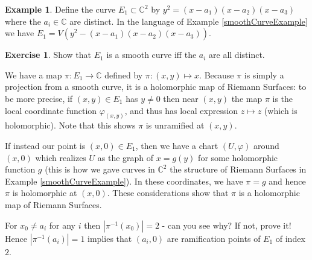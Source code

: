 \documentclass[12pt]{book}%
\theoremstyle{plain}
\theoremstyle{definition}
\newtheorem{example}[theorem]{Example}
\newtheorem{exercise}{Exercise}
\theoremstyle{remark}
\def\to{\rightarrow}
\def\bC{{\mathbb{C}}}
\begin{document}
\begin{example}
\label{ellipticCurveExample}
Define the curve $E_1\subset \bC^2$ by $y^2 = (x-a_1)(x-a_2)(x-a_3)$ where the $a_i \in \bC$ are distinct. In the language of Example \ref{smoothCurveExample} we have $E_1 = V( y^2 - (x-a_1)(x-a_2)(x-a_3))$.

\begin{exercise}
Show that $E_1$ is a smooth curve iff the $a_i$ are all distinct.
\end{exercise}

\begin{figure}
\label{ellipticCurveGraph}
\end{figure}


We have a map $\pi:E_1 \to \bC$ defined by $\pi: (x,y) \mapsto x$. Because $\pi$ is simply a projection from a smooth curve, it is a holomorphic map of Riemann Surfaces: to be more precise, if $(x,y)\in E_1$ has $y\neq 0$ then near $(x,y)$ the map $\pi$ is the local coordinate function $\varphi_{(x,y)}$, and thus has local expression $z \mapsto z$ (which is holomorphic). Note that this shows $\pi$ is unramified at $(x,y)$.
%
%

If instead our point is $(x,0) \in E_1$, then we have a chart $(U,\varphi)$ around $(x,0)$ which realizes $U$ as the graph of $x=g(y)$ for some holomorphic function $g$ (this is how we gave curves in $\bC^2$ the structure of Riemann Surfaces in Example \ref{smoothCurveExample}). In these coordinates, we have $\pi=g$ and hence $\pi$ is holomorphic at $(x,0)$. These considerations show that $\pi$ is a holomorphic map of Riemann Surfaces. 


For $x_0 \neq a_i$ for any $i$ then $|\pi^{-1}(x_0)|=2$ - can you see why? If not, prove it! Hence $|\pi^{-1}(a_i)|=1$ implies that $(a_i,0)$ are ramification points of $E_1$ of index $2$.


\end{example}
\end{document}
